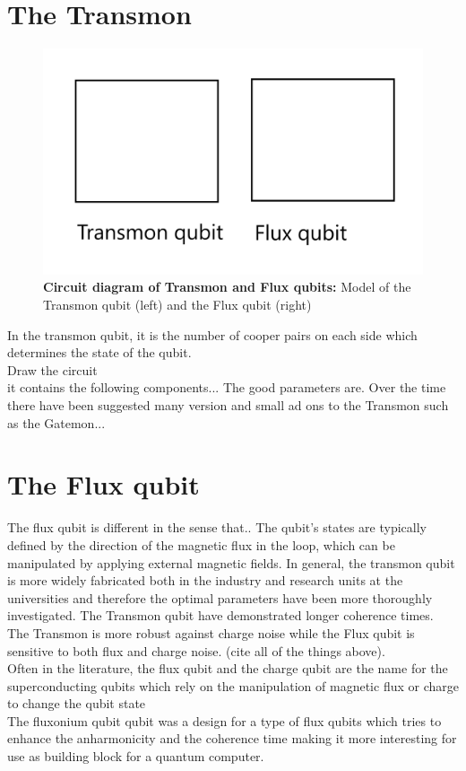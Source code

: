 \section{The Transmon}
    \begin{figure}
        \centering
        \includegraphics[width = 13 cm]{Images/Transmon and flux-qubit.png}
        \caption[Circuit diagram of Transmon and Flux qubits]{\textbf{Circuit diagram of Transmon and Flux qubits:} Model of the Transmon qubit (left) and the Flux qubit (right)}
        \label{Transmon_flux_qubit}
    \end{figure}
    In the transmon qubit, it is the number of cooper pairs on each side which determines the state of the qubit. 
    \\
    Draw the circuit
    \\
    it contains the following components... The good parameters are. Over the time there have been suggested many version and small ad ons to the Transmon such as the Gatemon...

\section{The Flux qubit}
    The flux qubit is different in the sense that.. The qubit's states are typically defined by the direction of the magnetic flux in the loop, which can be manipulated by applying external magnetic fields.
    In general, the transmon qubit is more widely fabricated both in the industry and research units at the universities and therefore the optimal parameters have been more thoroughly investigated. The Transmon qubit have demonstrated longer coherence times. The Transmon is more robust against charge noise while the Flux qubit is sensitive to both flux and charge noise. (cite all of the things above).
    \\ 
    Often in the literature, the flux qubit and the charge qubit are the name for the superconducting qubits which rely on the manipulation of magnetic flux or charge to change the qubit state
    \\
    The fluxonium qubit qubit was a design for a type of flux qubits which tries to enhance the anharmonicity and the coherence time making it more interesting for use as building block for a quantum computer. 
    

